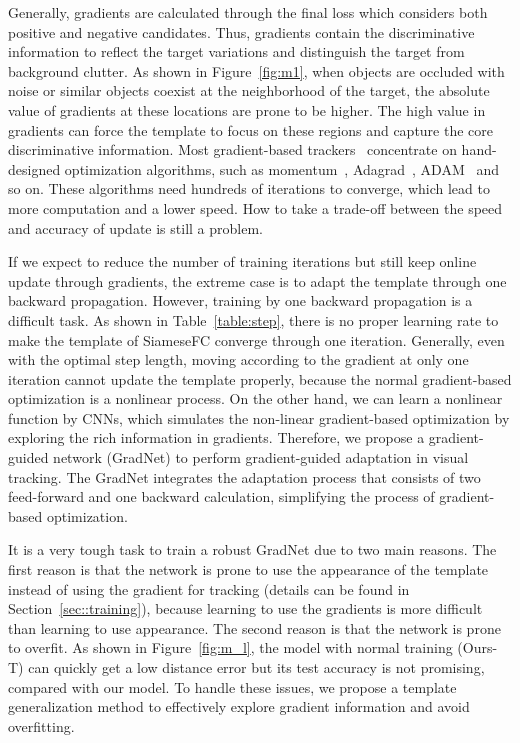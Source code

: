 \documentclass[10pt,twocolumn,letterpaper]{article}
\begin{document}
Generally, gradients are calculated through the final loss which considers both positive and negative candidates. Thus, gradients contain the discriminative information to reflect the target variations and distinguish the target from background clutter. As shown in Figure~\ref{fig:m1}, when objects are occluded with noise or similar objects coexist at the neighborhood of the target, the absolute value of gradients at these locations are prone to be higher. The high value in gradients can force the template to focus on these regions and capture the core discriminative information. Most gradient-based trackers~\cite{Wang-ICCV15-FCNT, crest-iccv2017} concentrate on hand-designed optimization algorithms, such as momentum~\cite{momentum}, Adagrad~\cite{adagrad}, ADAM~\cite{adam} and so on. These algorithms need hundreds of iterations to converge, which lead to more computation and a lower speed.
How to take a trade-off between the speed and accuracy of update is still a problem.




If we expect to reduce the number of training iterations but still keep online update through gradients, the extreme case is to adapt the template through one backward propagation.
However, training by one backward propagation is a difficult task.
As shown in Table~\ref{table:step}, there is no proper learning rate to make the template of SiameseFC converge through one iteration.
Generally, even with the optimal step length, moving according to the gradient at only one iteration cannot update the template properly, because the normal gradient-based optimization is a nonlinear process.
On the other hand, we can learn a nonlinear function by CNNs, which simulates the non-linear gradient-based optimization by exploring the rich information in gradients.
Therefore, we propose a gradient-guided network (GradNet) to perform gradient-guided adaptation in visual tracking.
The GradNet integrates the adaptation process that consists of two feed-forward and one backward calculation, simplifying the process of gradient-based optimization.


It is a very tough task to train a robust GradNet due to two main reasons.
The first reason is that the network is prone to use the appearance of the template instead of using the gradient for tracking (details can be found in Section~\ref{sec::training}), because learning to use the gradients is more difficult than learning to use appearance.
The second reason is that the network is prone to overfit. As shown in Figure~\ref{fig:m_l}, the model with normal training (Ours-T) can quickly get a low distance error but its test accuracy is not promising, compared with our model.
To handle these issues, we propose a template generalization method to effectively explore gradient information and avoid overfitting.
\end{document}
